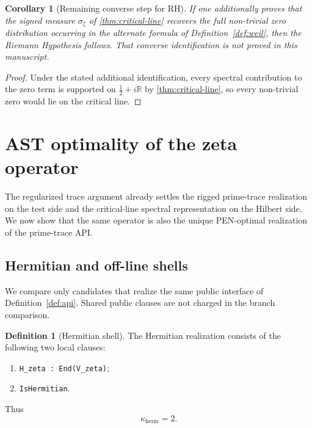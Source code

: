 \documentclass[11pt,a4paper]{article}
\theoremstyle{plain}
\newtheorem{corollary}[theorem]{Corollary}
\theoremstyle{definition}
\newtheorem{definition}[theorem]{Definition}
\newcommand{\R}{\mathbb{R}}
\newcommand{\effort}{\kappa}
\newcommand{\herm}{\mathrm{herm}}
\begin{document}
\begin{corollary}[Remaining converse step for RH]
\label{cor:rh-analytic}
If one additionally proves that the signed measure $\sigma_{\zeta}$ of \cref{thm:critical-line} recovers the full non-trivial zero distribution occurring in the alternate formula of Definition~\ref{def:weil}, then the Riemann Hypothesis follows. That converse identification is not proved in this manuscript.
\end{corollary}

\begin{proof}
Under the stated additional identification, every spectral contribution to the zero term is supported on $\tfrac12+i\R$ by \cref{thm:critical-line}, so every non-trivial zero would lie on the critical line.
\end{proof}

\section{AST optimality of the zeta operator}
\label{sec:ast}

The regularized trace argument already settles the rigged prime-trace realization on the test side and the critical-line spectral representation on the Hilbert side. We now show that the same operator is also the unique PEN-optimal realization of the prime-trace API.

\subsection{Hermitian and off-line shells}

We compare only candidates that realize the same public interface of Definition~\ref{def:api}. Shared public clauses are not charged in the branch comparison.

\begin{definition}[Hermitian shell]
\label{def:herm-shell}
The Hermitian realization consists of the following two local clauses:
\begin{enumerate}[label=(H\arabic*),nosep]
  \item \texttt{H\_zeta : End(V\_zeta)};
  \item \texttt{IsHermitian}.
\end{enumerate}
Thus
\[
  \effort_{\herm}=2.
\]
\end{definition}
\end{document}

